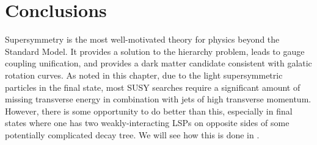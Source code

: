 \section{Conclusions}

Supersymmetry is the most well-motivated theory for physics beyond the Standard Model.
It provides a solution to the hierarchy problem, leads to gauge coupling unification, and provides a dark matter candidate consistent with galatic rotation curves.
As noted in this chapter, due to the light supersymmetric particles in the final state, most SUSY searches require a significant amount of missing transverse energy in combination with jets of high transverse momentum.
However, there is some opportunity to do better than this, especially in final states where one has two weakly-interacting LSPs on opposite sides of some potentially complicated decay tree.
We will see how this is done in .
